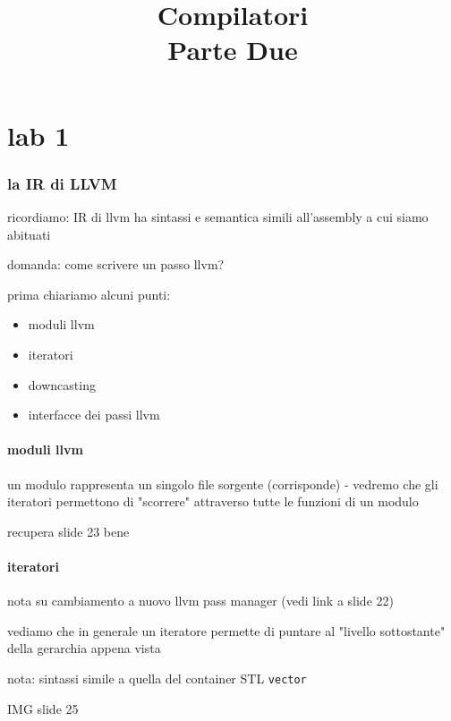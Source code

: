 

\title{%
Compilatori\\
\large Parte Due}


\maketitle
\tableofcontents
\newpage
\part{lab 1}

\section{la IR di LLVM}

ricordiamo: IR di llvm ha sintassi e semantica simili all'assembly a cui siamo abituati

domanda: come scrivere un passo llvm?

prima chiariamo alcuni punti:
\begin{itemize}
  \item moduli llvm
  \item iteratori
  \item downcasting
  \item interfacce dei passi llvm
\end{itemize}

\subsection{moduli llvm}

un modulo rappresenta un singolo file sorgente (corrisponde) - vedremo che gli iteratori permettono di "scorrere" attraverso tutte le funzioni di un modulo

recupera slide 23 bene



\subsection{iteratori}

nota su cambiamento a nuovo llvm pass manager (vedi link a slide 22)

vediamo che in generale un iteratore permette di puntare al "livello sottostante" della gerarchia appena vista

nota: sintassi simile a quella del container STL \lstinline|vector|

IMG slide 25

